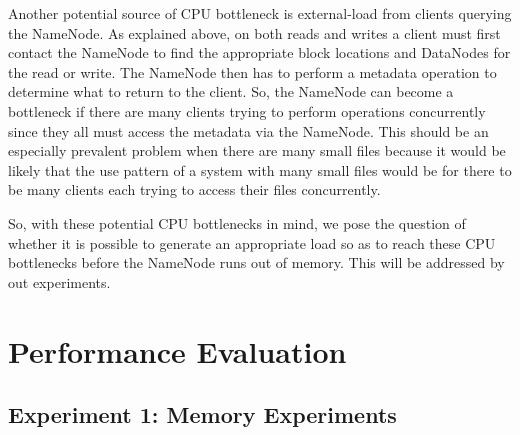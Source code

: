 \documentclass[11pt, a4paper]{article}
\begin{document}
\begin{multicols*}{2}


Another potential source of CPU bottleneck is external-load from clients querying the NameNode. As explained above, on both reads and writes a client must first contact the NameNode to find the appropriate block locations and DataNodes for the read or write. The NameNode then has to perform a metadata operation to determine what to return to the client. So, the NameNode can become a bottleneck if there are many clients trying to perform operations concurrently since they all must access the metadata via the NameNode. This should be an especially prevalent problem when there are many small files because it would be likely that the use pattern of a system with many small files would be for there to be many clients each trying to access their files concurrently. 

So, with these potential CPU bottlenecks in mind, we pose the question of whether it is possible to generate an appropriate load so as to reach these CPU bottlenecks before the NameNode runs out of memory. This will be addressed by out experiments. 

\section{Performance Evaluation}





\subsection{Experiment 1: Memory Experiments}


\end{multicols*}
\end{document}

